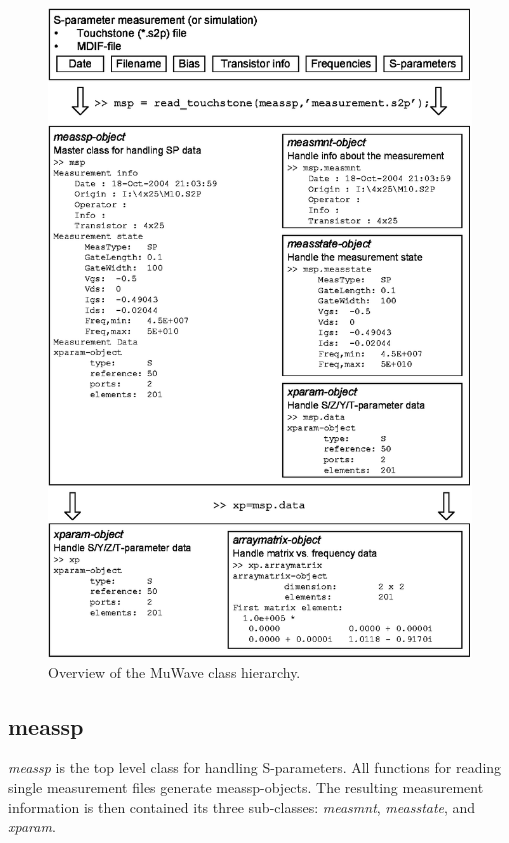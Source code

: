 \begin{figure}[htbf]
  \includegraphics[width=\textwidth]{Figures/ClassOverview3.eps}
  \caption{Overview of the MuWave class hierarchy.}\label{fig:ClassHierarchy}
\end{figure}

\subsection{meassp}
\emph{meassp} is the top level class for handling S-parameters.
All functions for reading single measurement files generate
meassp-objects. The resulting measurement information is then
contained its three sub-classes: \emph{measmnt}, \emph{measstate},
and \emph{xparam}.

